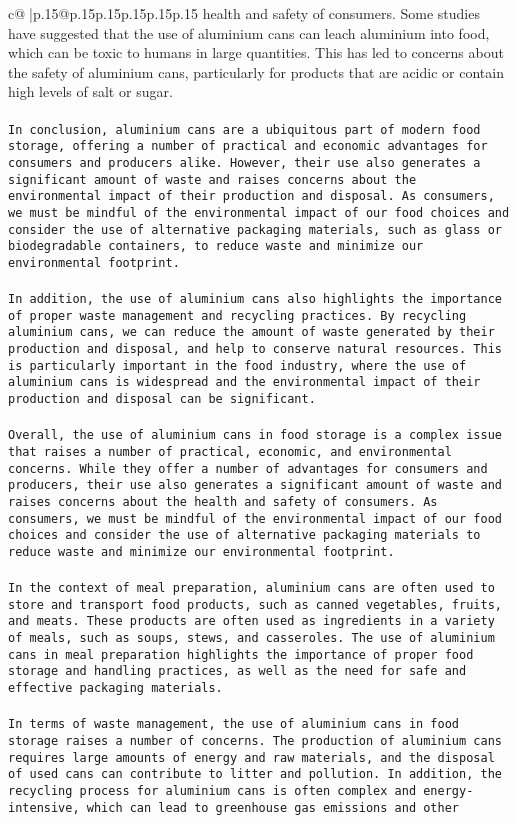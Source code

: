 \documentclass{article}
\begin{document}
{\begin{supertabular}{c@{$\;$}|p{.15\linewidth}@{}p{.15\linewidth}p{.15\linewidth}p{.15\linewidth}p{.15\linewidth}p{.15\linewidth}}
{{{health and safety of consumers. Some studies have suggested that the use of aluminium cans can leach aluminium into food, which can be toxic to humans in large quantities. This has led to concerns about the safety of aluminium cans, particularly for products that are acidic or contain high levels of salt or sugar.\\ \tt \\ \tt In conclusion, aluminium cans are a ubiquitous part of modern food storage, offering a number of practical and economic advantages for consumers and producers alike. However, their use also generates a significant amount of waste and raises concerns about the environmental impact of their production and disposal. As consumers, we must be mindful of the environmental impact of our food choices and consider the use of alternative packaging materials, such as glass or biodegradable containers, to reduce waste and minimize our environmental footprint.\\ \tt \\ \tt In addition, the use of aluminium cans also highlights the importance of proper waste management and recycling practices. By recycling aluminium cans, we can reduce the amount of waste generated by their production and disposal, and help to conserve natural resources. This is particularly important in the food industry, where the use of aluminium cans is widespread and the environmental impact of their production and disposal can be significant.\\ \tt \\ \tt Overall, the use of aluminium cans in food storage is a complex issue that raises a number of practical, economic, and environmental concerns. While they offer a number of advantages for consumers and producers, their use also generates a significant amount of waste and raises concerns about the health and safety of consumers. As consumers, we must be mindful of the environmental impact of our food choices and consider the use of alternative packaging materials to reduce waste and minimize our environmental footprint.\\ \tt \\ \tt In the context of meal preparation, aluminium cans are often used to store and transport food products, such as canned vegetables, fruits, and meats. These products are often used as ingredients in a variety of meals, such as soups, stews, and casseroles. The use of aluminium cans in meal preparation highlights the importance of proper food storage and handling practices, as well as the need for safe and effective packaging materials.\\ \tt \\ \tt In terms of waste management, the use of aluminium cans in food storage raises a number of concerns. The production of aluminium cans requires large amounts of energy and raw materials, and the disposal of used cans can contribute to litter and pollution. In addition, the recycling process for aluminium cans is often complex and energy-intensive, which can lead to greenhouse gas emissions and other }}}
\end{supertabular}}
\end{document}
